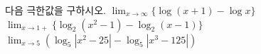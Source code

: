 다음 극한값을 구하시오.
 $\displaystyle\lim_{x\to\infty}\{\log(x+1)-\log x\}$
 $\displaystyle\lim_{x\to 1+}\{\log_2(x^2-1)-\log_2(x-1)\}$
 $\displaystyle\lim_{x\to 5}(\log_5|x^2-25|-\log_5|x^3-125|)$
